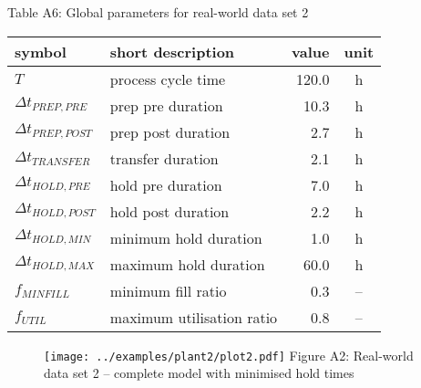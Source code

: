 \begin{table}[h!]
    \centering Table A6: Global parameters for real-world data set 2
    \label{tbl.parameters2}
    \begin{tabular}{l | l | r | c}
        symbol & short description & value & unit\\ \hline
        $T$ & process cycle time & 120.0 & h\\
        $\Delta t_{\mathit{PREP,PRE}}$ & prep pre duration & 10.3 & h\\
        $\Delta t_{\mathit{PREP,POST}}$ & prep post duration & 2.7 & h\\
        $\Delta t_{\mathit{TRANSFER}}$ & transfer duration & 2.1 & h\\
        $\Delta t_{\mathit{HOLD,PRE}}$ & hold pre duration & 7.0 & h\\
        $\Delta t_{\mathit{HOLD,POST}}$ & hold post duration & 2.2 & h\\
        $\Delta t_{\mathit{HOLD,MIN}}$ & minimum hold duration & 1.0 & h\\
        $\Delta t_{\mathit{HOLD,MAX}}$ & maximum hold duration & 60.0 & h\\
        $f_{\mathit{MINFILL}}$ & minimum fill ratio & 0.3 & --\\
        $f_{\mathit{UTIL}}$ & maximum utilisation ratio & 0.8 & --\\
    \end{tabular}
\end{table}

\begin{figure}[h]
    \centering
    \texttt{[image: ../examples/plant2/plot2.pdf]}
    Figure A2: Real-world data set 2 -- complete model with minimised
        hold times
    \label{fig.secondary1}
\end{figure}

